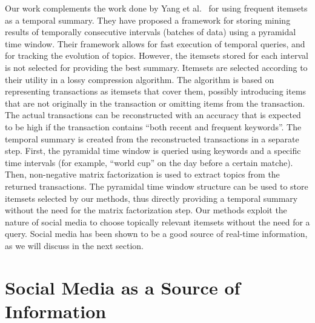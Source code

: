 \documentclass[letterpaper,12pt,titlepage,oneside,final]{book}
\begin{document}
Our work complements the work done by Yang et al.~\cite{yang2012framework} for 
using frequent itemsets as a temporal summary. 
They have proposed a framework for storing mining results of 
temporally consecutive intervals (batches of data) using a pyramidal time window. 
Their framework allows for fast execution of temporal queries, and for tracking the evolution of topics. 
However, the itemsets stored for each interval is not selected for providing the best summary.
Itemsets are selected according to their utility in a
lossy compression algorithm.
The algorithm is based on representing transactions as itemsets that cover them, 
possibly introducing items that are not originally in the transaction or omitting items from the transaction.
The actual transactions can be reconstructed with an accuracy that is expected to be high 
if the transaction contains ``both recent and frequent keywords''. 
The temporal summary is created from the reconstructed transactions in a separate step.
First, the pyramidal time window is queried using keywords and a specific time intervals 
(for example, ``world cup'' on the day before a certain matche).
Then, non-negative matrix factorization is used to extract topics from the returned transactions.
The pyramidal time window structure can be used to store itemsets
selected by our methods, 
thus directly providing a temporal summary
without the need for the matrix factorization step.
Our methods exploit the nature of social media to choose topically relevant itemsets without the need for a query. 
Social media has been shown to be a good source of real-time information, as we will discuss in the next section.

\section{Social Media as a Source of Information}
\end{document}
